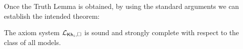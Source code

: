 Once the Truth Lemma is obtained, by using the standard arguments we can establish the intended theorem:

\medskip

\begin{theorem}\label{th:cm-ults-khikt-completeness}
The axiom system $\mathcal{L}_{{\sf Kh}_i,\square}$ is sound and strongly complete with respect to the class of all models.
\end{theorem}

